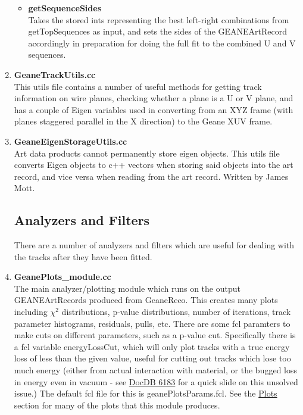 \begin{enumerate}
\begin{itemize}
          \item{\bf{getSequenceSides}} \\
          Takes the stored ints representing the best left-right combinations from getTopSequences as input, and sets the sides of the GEANEArtRecord accordingly in preparation for doing the full fit to the combined U and V sequences.

        \end{itemize}

      \item{\bf{GeaneTrackUtils.cc}} \\
      This utils file contains a number of useful methods for getting track information on wire planes, checking whether a plane is a U or V plane, and has a couple of Eigen variables used in converting from an XYZ frame (with planes staggered parallel in the X direction) to the Geane XUV frame.

      \item{\bf{GeaneEigenStorageUtils.cc}} \\
      Art data products cannot permanently store eigen objects. This utils file converts Eigen objects to c++ vectors when storing said objects into the art record, and vice versa when reading from the art record. Written by James Mott.



  \subsection{Analyzers and Filters}
  \label{sec:AnaFilt}

  There are a number of analyzers and filters which are useful for dealing with the tracks after they have been fitted.

      \item{\bf{GeanePlots\_module.cc}} \\
      The main analyzer/plotting module which runs on the output GEANEArtRecords produced from GeaneReco. This creates many plots including $\chi^{2}$ distributions, p-value distributions, number of iterations, track parameter histograms, residuals, pulls, etc. There are some fcl paramters to make cuts on different parameters, such as a p-value cut. Specifically there is a fcl variable energyLossCut, which will only plot tracks with a true energy loss of less than the given value, useful for cutting out tracks which lose too much energy (either from actual interaction with material, or the bugged loss in energy even in vacuum - see \href{https://gm2-docdb.fnal.gov/cgi-bin/private/ShowDocument?docid=6183}{DocDB 6183} for a quick slide on this unsolved issue.) The default fcl file for this is geanePlotsParams.fcl. See the \hyperref[sec:Plots]{Plots} section for many of the plots that this module produces.


\end{enumerate}
